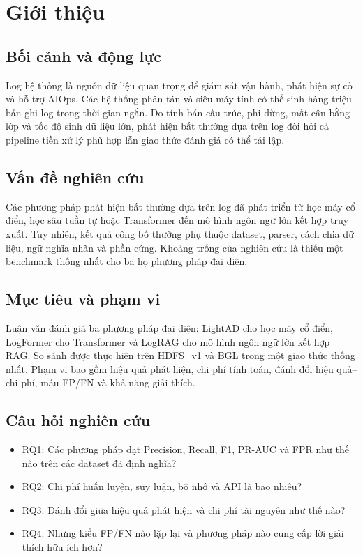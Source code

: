 \chapter{Giới thiệu}

\section{Bối cảnh và động lực}
Log hệ thống là nguồn dữ liệu quan trọng để giám sát vận hành, phát hiện sự cố
và hỗ trợ AIOps. Các hệ thống phân tán và siêu máy tính có thể sinh hàng triệu
bản ghi log trong thời gian ngắn. Do tính bán cấu trúc, phi dừng, mất cân bằng
lớp và tốc độ sinh dữ liệu lớn, phát hiện bất thường dựa trên log đòi hỏi cả
pipeline tiền xử lý phù hợp lẫn giao thức đánh giá có thể tái lập.

\section{Vấn đề nghiên cứu}
Các phương pháp phát hiện bất thường dựa trên log đã phát triển từ học máy cổ
điển, học sâu tuần tự hoặc Transformer đến mô hình ngôn ngữ lớn kết hợp truy
xuất. Tuy nhiên, kết quả công bố thường phụ thuộc dataset, parser, cách chia
dữ liệu, ngữ nghĩa nhãn và phần cứng. Khoảng trống của nghiên cứu là thiếu một
benchmark thống nhất cho ba họ phương pháp đại diện.

\section{Mục tiêu và phạm vi}
Luận văn đánh giá ba phương pháp đại diện: LightAD cho học máy cổ điển,
LogFormer cho Transformer và LogRAG cho mô hình ngôn ngữ lớn kết hợp RAG.
So sánh được thực hiện trên HDFS\_v1 và BGL trong một giao thức thống nhất.
Phạm vi bao gồm hiệu quả phát hiện, chi phí tính toán, đánh đổi hiệu quả--chi
phí, mẫu FP/FN và khả năng giải thích.

\section{Câu hỏi nghiên cứu}
\begin{itemize}
  \item RQ1: Các phương pháp đạt Precision, Recall, F1, PR-AUC và FPR như thế
  nào trên các dataset đã định nghĩa?
  \item RQ2: Chi phí huấn luyện, suy luận, bộ nhớ và API là bao nhiêu?
  \item RQ3: Đánh đổi giữa hiệu quả phát hiện và chi phí tài nguyên như thế
  nào?
  \item RQ4: Những kiểu FP/FN nào lặp lại và phương pháp nào cung cấp lời giải
  thích hữu ích hơn?
\end{itemize}

